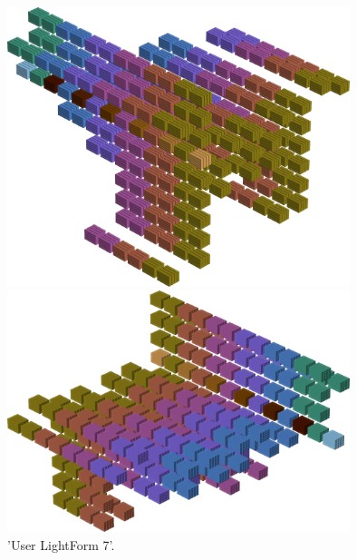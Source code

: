 \begin{minipage}[b]{0.48\linewidth}
\begin{figure}[H]
    \centering
    \begin{adjustbox}{width=5cm,margin=0cm -1cm}
      \includegraphics[width=10cm]{src/colorspace_patterns/pattern15-45.png}%
    \end{adjustbox}
    \begin{adjustbox}{width=5cm,margin=0cm 0cm}
      \includegraphics[width=10cm]{src/colorspace_patterns/pattern15-225.png}%
    \end{adjustbox}
\caption{'User LightForm 7'.}
\end{figure}
\end{minipage}
